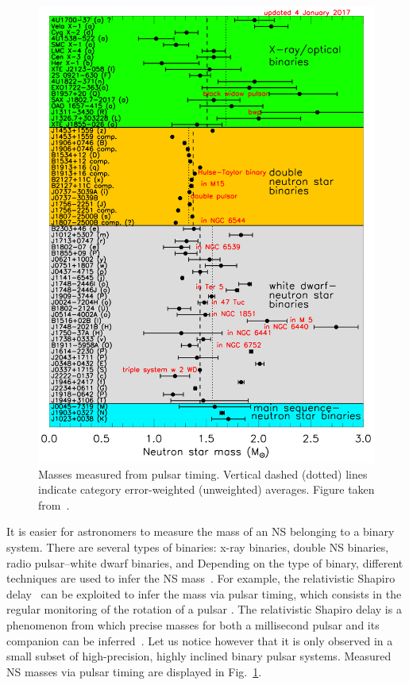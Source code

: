 \begin{figure}[!t]
\begin{center}
  \includegraphics[width=0.7\linewidth]{figures/masses.png}
\end{center}
\caption[Masses measured from pulsar timing]{Masses 
measured from pulsar timing. Vertical dashed (dotted) lines indicate category 
error-weighted (unweighted) averages. Figure taken 
from~\cite{Lattimer2019}.}\label{fig:masses_lattimer}
\end{figure}
%
It is easier for astronomers to measure the mass of an NS belonging to a binary 
system. There are several types of binaries: x-ray binaries, double NS 
binaries, radio pulsar--white dwarf binaries, and  Depending on the type 
  of binary, different techniques are used to infer the NS 
  mass~\cite{Haensel2007}.
For example,  the relativistic Shapiro 
delay~\cite{Shapiro1964} can be exploited to infer the mass via pulsar timing, 
which consists in the regular monitoring of 
the rotation of a pulsar . The relativistic 
Shapiro delay is a phenomenon from which precise masses for both a millisecond 
pulsar and its companion can be inferred~\cite{Demorest2010,Cromartie2020}. Let 
us notice however that it is only observed in a small subset of high-precision, 
highly inclined binary pulsar systems. Measured NS masses via pulsar timing are
displayed in Fig.~\ref{fig:masses_lattimer}. 

